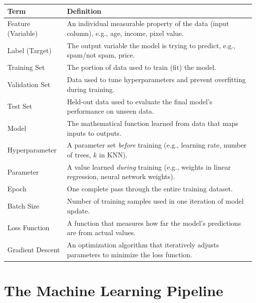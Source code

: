 \documentclass[11pt,a4paper]{article}
\begin{document}
\begin{longtable}{@{}p{3.5cm}p{10cm}@{}}
\toprule
\rowcolor{primary!15}
\textbf{Term} & \textbf{Definition} \\
\midrule
\endhead
Feature (Variable) & An individual measurable property of the data (input column), e.g., age, income, pixel value. \\
\addlinespace
Label (Target) & The output variable the model is trying to predict, e.g., spam/not spam, price. \\
\addlinespace
Training Set & The portion of data used to train (fit) the model. \\
\addlinespace
Validation Set & Data used to tune hyperparameters and prevent overfitting during training. \\
\addlinespace
Test Set & Held-out data used to evaluate the final model's performance on unseen data. \\
\addlinespace
Model & The mathematical function learned from data that maps inputs to outputs. \\
\addlinespace
Hyperparameter & A parameter set \emph{before} training (e.g., learning rate, number of trees, $k$ in KNN). \\
\addlinespace
Parameter & A value learned \emph{during} training (e.g., weights in linear regression, neural network weights). \\
\addlinespace
Epoch & One complete pass through the entire training dataset. \\
\addlinespace
Batch Size & Number of training samples used in one iteration of model update. \\
\addlinespace
Loss Function & A function that measures how far the model's predictions are from actual values. \\
\addlinespace
Gradient Descent & An optimization algorithm that iteratively adjusts parameters to minimize the loss function. \\
\bottomrule
\end{longtable}

\section{The Machine Learning Pipeline}
\end{document}

